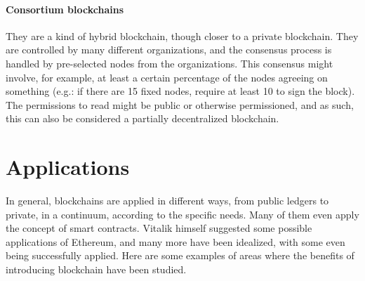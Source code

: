     \paragraph{Consortium blockchains} They are a kind of hybrid blockchain, though closer to a private blockchain. They are controlled by many different organizations, and the consensus process is handled by pre-selected nodes from the organizations. This consensus might involve, for example, at least a certain percentage of the nodes agreeing on something (e.g.: if there are 15 fixed nodes, require at least 10 to sign the block). The permissions to read might be public or otherwise permissioned, and as such, this can also be considered a partially decentralized blockchain.



\section{Applications}

    In general, blockchains are applied in different ways, from public ledgers to private, in a continuum, according to the specific needs. Many of them even apply the concept of smart contracts. Vitalik himself suggested some possible applications of Ethereum, and many more have been idealized, with some even being successfully applied. Here are some examples of areas where the benefits of introducing blockchain have been studied.
    
